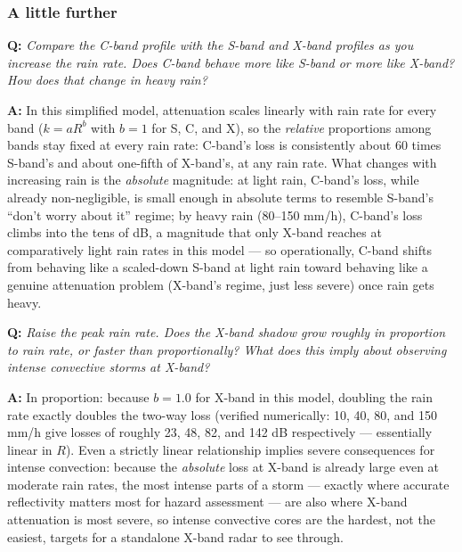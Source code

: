 \documentclass[11pt]{article}
\newenvironment{qa}[1]{\par\noindent\textbf{\color{qgray}Q: }\emph{#1}\par\noindent\textbf{A: }}{\par\vspace{6pt}}
\newcommand{\tier}[1]{\subsubsection*{#1}}
\begin{document}
\tier{A little further}
\begin{qa}{Compare the C-band profile with the S-band and X-band profiles as you increase the rain rate. Does C-band behave more like S-band or more like X-band? How does that change in heavy rain?}
In this simplified model, attenuation scales linearly with rain rate for every band ($k=aR^b$ with $b=1$ for S, C, and X), so the \emph{relative} proportions among bands stay fixed at every rain rate: C-band's loss is consistently about 60 times S-band's and about one-fifth of X-band's, at any rain rate. What changes with increasing rain is the \emph{absolute} magnitude: at light rain, C-band's loss, while already non-negligible, is small enough in absolute terms to resemble S-band's ``don't worry about it'' regime; by heavy rain (80--150 mm/h), C-band's loss climbs into the tens of dB, a magnitude that only X-band reaches at comparatively light rain rates in this model --- so operationally, C-band shifts from behaving like a scaled-down S-band at light rain toward behaving like a genuine attenuation problem (X-band's regime, just less severe) once rain gets heavy.
\end{qa}
\begin{qa}{Raise the peak rain rate. Does the X-band shadow grow roughly in proportion to rain rate, or faster than proportionally? What does this imply about observing intense convective storms at X-band?}
In proportion: because $b=1.0$ for X-band in this model, doubling the rain rate exactly doubles the two-way loss (verified numerically: 10, 40, 80, and 150 mm/h give losses of roughly 23, 48, 82, and 142 dB respectively --- essentially linear in $R$). Even a strictly linear relationship implies severe consequences for intense convection: because the \emph{absolute} loss at X-band is already large even at moderate rain rates, the most intense parts of a storm --- exactly where accurate reflectivity matters most for hazard assessment --- are also where X-band attenuation is most severe, so intense convective cores are the hardest, not the easiest, targets for a standalone X-band radar to see through.
\end{qa}
\end{document}
